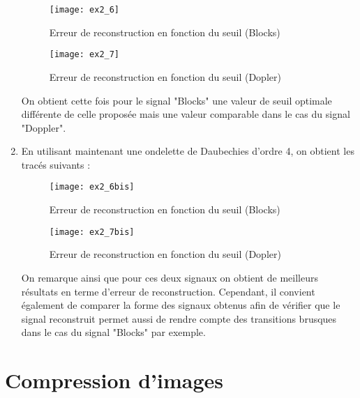 \documentclass[12pt,a4paper,titlepage]{article}
\begin{document}
\begin{enumerate}
{                \begin{figure}[H]
                    \caption{Erreur de reconstruction en fonction du seuil (Blocks)}
                    \texttt{[image: ex2\_6]}
                    \centering
                \end{figure}

                \begin{figure}[H]
                    \caption{Erreur de reconstruction en fonction du seuil (Dopler)}
                    \texttt{[image: ex2\_7]}
                    \centering
                \end{figure}

                On obtient cette fois pour le signal "Blocks" une valeur de seuil optimale différente
                de celle proposée mais une valeur comparable dans le cas du signal "Doppler".
            }

        \item{En utilisant maintenant une ondelette de Daubechies d'ordre 4,
                on obtient les tracés suivants :

                \begin{figure}[H]
                    \caption{Erreur de reconstruction en fonction du seuil (Blocks)}
                    \texttt{[image: ex2\_6bis]}
                    \centering
                \end{figure}

                \begin{figure}[H]
                    \caption{Erreur de reconstruction en fonction du seuil (Dopler)}
                    \texttt{[image: ex2\_7bis]}
                    \centering
                \end{figure}

                On remarque ainsi que pour ces deux signaux on obtient de meilleurs résultats
                en terme d'erreur de reconstruction. Cependant, il convient également de comparer
                la forme des signaux obtenus afin de vérifier que le signal reconstruit permet
                aussi de rendre compte des transitions brusques dans le cas du signal "Blocks"
                par exemple.

            }

    \end{enumerate}

    \section{Compression d'images}
\end{document}
